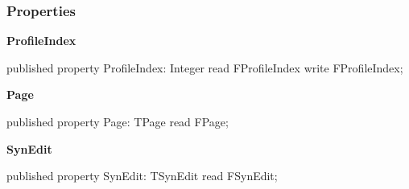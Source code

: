 \documentclass{report}
\newif\ifpdf
\begin{document}
\subsubsection*{\large{\textbf{Properties}}\normalsize\hspace{1ex}\hfill}
\begin{list}{}{
\setlength{\itemindent}{0cm}
\setlength{\listparindent}{0cm}
\setlength{\leftmargin}{\evensidemargin}
\addtolength{\leftmargin}{\tmplength}
\settowidth{\labelsep}{X}
\addtolength{\leftmargin}{\labelsep}
\setlength{\labelwidth}{\tmplength}
}
\label{editor.TFileProfile-ProfileIndex}
\item[\textbf{ProfileIndex}\hfill]
\ifpdf
\begin{flushleft}
\fi
\begin{ttfamily}
published property ProfileIndex: Integer read FProfileIndex write FProfileIndex;\end{ttfamily}

\ifpdf
\end{flushleft}
\fi


\par  \label{editor.TFileProfile-Page}
\item[\textbf{Page}\hfill]
\ifpdf
\begin{flushleft}
\fi
\begin{ttfamily}
published property Page: TPage read FPage;\end{ttfamily}

\ifpdf
\end{flushleft}
\fi


\par  \label{editor.TFileProfile-SynEdit}
\item[\textbf{SynEdit}\hfill]
\ifpdf
\begin{flushleft}
\fi
\begin{ttfamily}
published property SynEdit: TSynEdit read FSynEdit;\end{ttfamily}

\ifpdf
\end{flushleft}
\fi


\par  \end{list}
\end{document}
